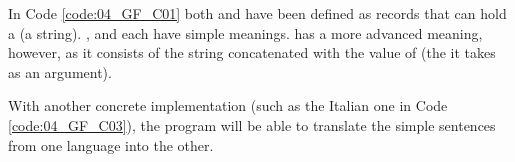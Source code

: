 In Code \ref{code:04_GF_C01} both  and  have been defined as records that can hold a  (a string). ,  and  each have simple meanings.  has a more advanced meaning, however, as it consists of the string  concatenated with the value of  (the  it takes as an argument).



With another concrete implementation (such as the Italian one in Code \ref{code:04_GF_C03}), the program will be able to translate the simple sentences from one language into the other. 